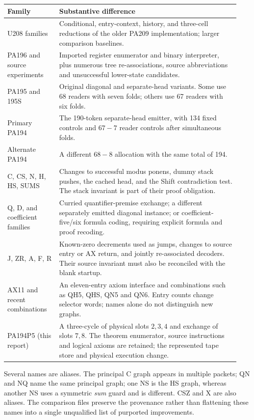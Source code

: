 \documentclass[11pt,letterpaper]{article}
\begin{document}
\begin{longtable}{@{}p{0.21\linewidth}p{0.73\linewidth}@{}}
\toprule Family & Substantive difference\\\midrule\endhead
U208 families &
Conditional, entry-context, history, and three-cell reductions of
the older PA209 implementation; larger comparison baselines.\\[4pt]
PA196 and source experiments &
Imported register enumerator and binary interpreter, plus numerous
tree re-associations, source abbreviations and unsuccessful lower-state
candidates.\\[4pt]
PA195 and 195S &
Original diagonal and separate-head variants. Some use 68 readers
with seven folds; others use 67 readers with six folds.\\[4pt]
Primary PA194 &
The 190-token separate-head emitter, with 134 fixed controls and
$67-7$ reader controls after simultaneous folds.\\[4pt]
Alternate PA194 &
A different $68-8$ allocation with the same total of 194.\\[4pt]
C, CS, N, H, HS, SUMS &
Changes to successful modus ponens, dummy stack pushes, the cached
head, and the Shift contradiction test. The stack invariant is
part of their proof obligation.\\[4pt]
Q, D, and coefficient families &
Curried quantifier-premise exchange; a different separately emitted
diagonal instance; or coefficient-five/six formula coding, requiring
explicit formula and proof recoding.\\[4pt]
J, ZR, A, F, R &
Known-zero decrements used as jumps, changes to source entry or AX
return, and jointly re-associated decoders. Their source invariant
must also be reconciled with the blank startup.\\[4pt]
AX11 and recent combinations &
An eleven-entry axiom interface and combinations such as QH5,
QHS, QN5 and QN6. Entry counts change selector words; names alone
do not distinguish new graphs.\\[4pt]
PA194P5 (this report) &
A three-cycle of physical slots $2,3,4$ and exchange of slots $7,8$.
The theorem enumerator, source instructions and logical axioms are
retained; the represented tape store and physical execution change.\\
\bottomrule
\end{longtable}

Several names are aliases. The principal C graph appears in multiple
packets; QN and NQ name the same principal graph; one NS is the HS
graph, whereas another NS uses a symmetric \emph{sum} guard and is
different. CSZ and X are also aliases. The comparison files preserve
the provenance rather than flattening these names into a single
unqualified list of purported improvements.
\end{document}
